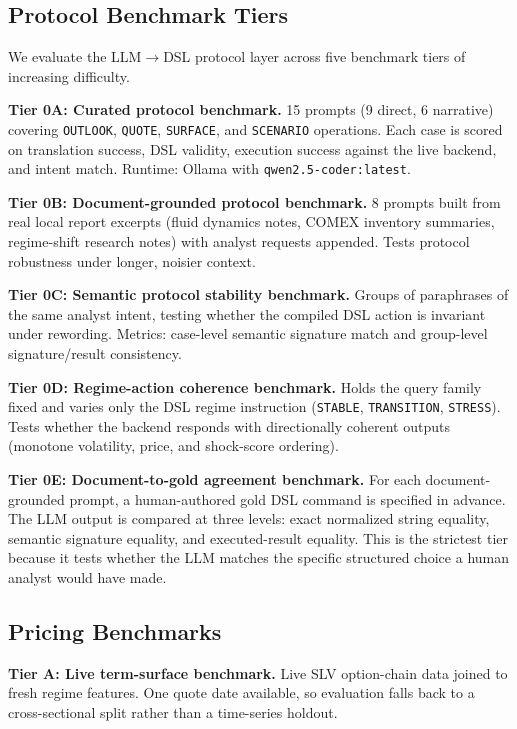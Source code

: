 \documentclass[11pt,a4paper]{article}
\begin{document}
\subsection{Protocol Benchmark Tiers}

We evaluate the LLM$\to$DSL protocol layer across five benchmark tiers of increasing difficulty.

\textbf{Tier 0A: Curated protocol benchmark.} 15 prompts (9 direct, 6 narrative) covering \texttt{OUTLOOK}, \texttt{QUOTE}, \texttt{SURFACE}, and \texttt{SCENARIO} operations. Each case is scored on translation success, DSL validity, execution success against the live backend, and intent match. Runtime: Ollama with \texttt{qwen2.5-coder:latest}.

\textbf{Tier 0B: Document-grounded protocol benchmark.} 8 prompts built from real local report excerpts (fluid dynamics notes, COMEX inventory summaries, regime-shift research notes) with analyst requests appended. Tests protocol robustness under longer, noisier context.

\textbf{Tier 0C: Semantic protocol stability benchmark.} Groups of paraphrases of the same analyst intent, testing whether the compiled DSL action is invariant under rewording. Metrics: case-level semantic signature match and group-level signature/result consistency.

\textbf{Tier 0D: Regime-action coherence benchmark.} Holds the query family fixed and varies only the DSL regime instruction (\texttt{STABLE}, \texttt{TRANSITION}, \texttt{STRESS}). Tests whether the backend responds with directionally coherent outputs (monotone volatility, price, and shock-score ordering).

\textbf{Tier 0E: Document-to-gold agreement benchmark.} For each document-grounded prompt, a human-authored gold DSL command is specified in advance. The LLM output is compared at three levels: exact normalized string equality, semantic signature equality, and executed-result equality. This is the strictest tier because it tests whether the LLM matches the specific structured choice a human analyst would have made.

\subsection{Pricing Benchmarks}

\textbf{Tier A: Live term-surface benchmark.} Live SLV option-chain data joined to fresh regime features. One quote date available, so evaluation falls back to a cross-sectional split rather than a time-series holdout.
\end{document}
